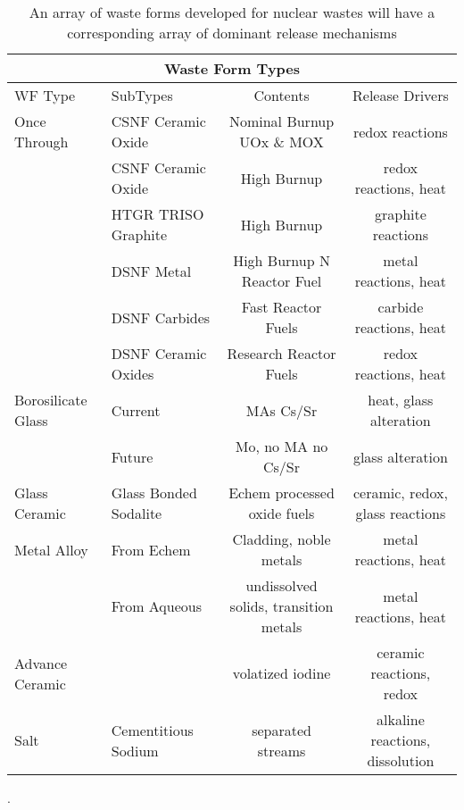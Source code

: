 %
\begin{table}[h!]
  \centering
  \footnotesize{
  \begin{tabular}{|l|l|c|c|}
    \multicolumn{4}{c}{\textbf{Waste Form Types}}\\
    \hline
    WF Type & SubTypes & Contents & Release Drivers  \\
    \hline
    \hline
    Once Through & \gls{CSNF} Ceramic Oxide & Nominal Burnup UOx \& MOX & redox reactions \\
                 & \gls{CSNF} Ceramic Oxide & High Burnup  & redox reactions, heat  \\
                 & \gls{HTGR} TRISO Graphite & High Burnup & graphite reactions\\
                 & \gls{DSNF} Metal  & High Burnup N Reactor Fuel & metal reactions,  heat\\
                 & \gls{DSNF} Carbides  & Fast Reactor Fuels & carbide reactions,  heat\\
                 & \gls{DSNF} Ceramic Oxides  & Research Reactor Fuels & redox reactions,  heat\\
    \hline
    Borosilicate Glass & Current & \glspl{MA} Cs/Sr & heat, glass alteration \\
                       & Future & Mo, no \gls{MA} no Cs/Sr & glass alteration  \\
    \hline
    Glass Ceramic & Glass Bonded Sodalite & Echem processed oxide fuels & ceramic, redox, glass reactions  \\
    \hline
    Metal Alloy & From Echem & Cladding, noble metals & metal reactions, heat \\
                & From Aqueous & undissolved solids, transition metals & metal reactions, heat  \\
    \hline
    Advance Ceramic &  & volatized iodine  & ceramic reactions, redox \\
    \hline
    Salt  & Cementitious Sodium  & separated streams  & alkaline reactions, dissolution \\
    \hline
  \end{tabular}
  \caption[Waste Form Types]{An array of waste forms developed for nuclear 
  wastes will have a corresponding array of dominant release mechanisms \cite{blink_disposal_2010}}.
  \label{tab:wf}
  }
\end{table}


